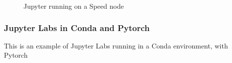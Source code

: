 \begin{figure}[htbp]
	\centering
	\caption{Jupyter running on a Speed node}
	\label{fig:jupyter}
\end{figure}

\subsubsection{Jupyter Labs in Conda and Pytorch}
\label{sect:jupiterlabs}

This is an example of Jupyter Labs running in a Conda environment, with Pytorch

